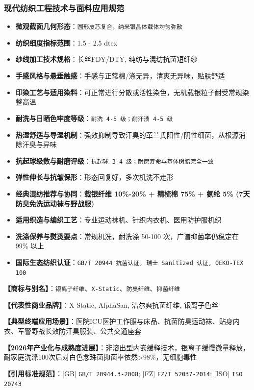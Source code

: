 \documentclass[11pt,openright,twoside,UTF8]{ctexbook}
\begin{document}
\subsubsection*{现代纺织工程技术与面料应用规范}
\begin{itemize} \setlength{\itemsep}{2pt}
    \item \textbf{微观截面几何形态}：\texttt{圆形皮芯复合，纳米银晶体载体均匀弥散}
    \item \textbf{纺织细度指标范围}：1.5 - 2.5 dtex
    \item \textbf{纱线加工技术规格}：长丝FDY/DTY, 纯纺与混纺抗菌短纤纱
    \item \textbf{手感风格与悬垂触感}：手感与正常棉/涤无异，清爽无异味，贴肤舒适
    \item \textbf{印染工艺与适用染料}：可正常进行分散或活性染色，无机载银粒子耐受常规染整高温
    \item \textbf{耐洗与日晒色牢度等级}：\texttt{耐洗 4-5 级；耐汗渍 4-5 级}
    \item \textbf{热湿舒适与导湿机制}：强效抑制导致汗臭的革兰氏阳性/阴性细菌，从根源消除汗臭与异味
    \item \textbf{抗起球级数与耐磨评级}：\texttt{抗起球 3-4 级；耐磨寿命与基体树脂完全一致}
    \item \textbf{弹性伸长与抗皱保形}：形态回复好，多次机洗不走形
    \item \textbf{经典混纺推荐与协同}：\textbf{载银纤维 10\%-20\% + 精梳棉 75\% + 氨纶 5\% (7天防臭免洗运动袜与野战服)}
    \item \textbf{适用织造与编织工艺}：专业运动袜机、针织内衣机、医用防护服机织
    \item \textbf{洗涤保养与熨烫要点}：常规机洗，耐洗涤 50-100 次，广谱抑菌率仍稳定在 99\% 以上
    \item \textbf{国际生态纺织认证}：\texttt{GB/T 20944 抗菌认证, 瑞士 Sanitized 认证, OEKO-TEX 100}
\end{itemize}
\vspace{0.2cm}

\noindent\textbf{【商标与别名】}：\texttt{银离子纤维}、\texttt{X-Static}、\texttt{防臭纤维}、\texttt{抑菌纤维}\par
\noindent\textbf{【代表性商业品牌】}：X-Static, AlphaSan, 洁尔爽抗菌纤维, 银离子色丝\par
\noindent\textbf{【典型终端应用场景】}：医院ICU医护工作服与床品、抗菌防臭运动袜、贴身内衣、军警野战长效防汗臭服装、公共交通座套\par
\noindent\textbf{【2026年产业化与成熟度进展】}：非溶出型内嵌缓释技术，银离子缓慢微量释放，耐家庭洗涤100次后对白色念珠菌抑菌率依然\textgreater{}98\%，无细胞毒性\par
\noindent\textbf{【引用标准规范】}：[GB] \texttt{GB/T 20944.3-2008}; [FZ] \texttt{FZ/T 52037-2014}; [ISO] \texttt{ISO 20743}\par
\vspace{0.5cm}
\end{document}
